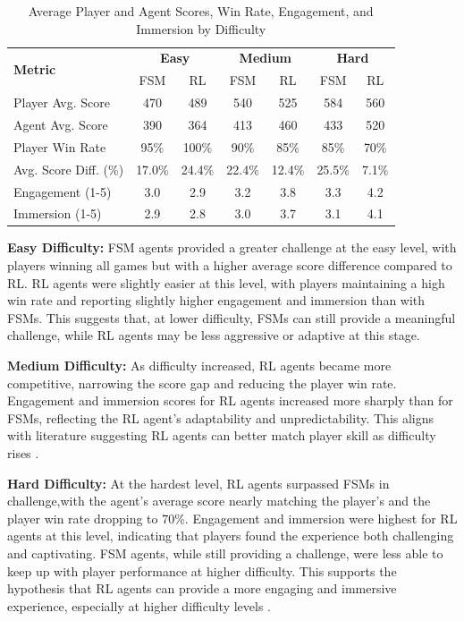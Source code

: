 \documentclass[conference]{IEEEtran}
\begin{document}
\begin{table}[h]
\centering
\caption{Average Player and Agent Scores, Win Rate, Engagement, and Immersion by Difficulty}
\label{tab:results}
\begin{tabular}{lcccccc}
\hline
\multirow{2}{*}{\textbf{Metric}} & \multicolumn{2}{c}{\textbf{Easy}} & \multicolumn{2}{c}{\textbf{Medium}} & \multicolumn{2}{c}{\textbf{Hard}} \\
 & FSM & RL & FSM & RL & FSM & RL \\
\hline
Player Avg. Score         & 470 & 489 & 540 & 525 & 584 & 560 \\
Agent Avg. Score          & 390 & 364 & 413 & 460 & 433 & 520 \\
Player Win Rate           & 95\% & 100\% & 90\% & 85\% & 85\% & 70\% \\
Avg. Score Diff. (\%)     & 17.0\% & 24.4\% & 22.4\% & 12.4\% & 25.5\% & 7.1\% \\
Engagement (1-5)          & 3.0 & 2.9 & 3.2 & 3.8 & 3.3 & 4.2 \\
Immersion (1-5)           & 2.9 & 2.8 & 3.0 & 3.7 & 3.1 & 4.1 \\
\hline
\end{tabular}
\end{table}

\textbf{Easy Difficulty:}  
FSM agents provided a greater challenge at the easy level, with players winning all games but with a higher average score difference compared to RL. RL agents were slightly easier at this level,
with players maintaining a high win rate and reporting slightly higher engagement and immersion than with FSMs. This suggests that, at lower difficulty, FSMs can still provide a meaningful challenge,
while RL agents may be less aggressive or adaptive at this stage.

\textbf{Medium Difficulty:}  
As difficulty increased, RL agents became more competitive, narrowing the score gap and reducing the player win rate. Engagement and immersion scores for RL agents increased more sharply than for FSMs,
reflecting the RL agent's adaptability and unpredictability. This aligns with literature suggesting RL agents can better match player skill as difficulty rises \cite{grech_creating_2023}.

\textbf{Hard Difficulty:}  
At the hardest level, RL agents surpassed FSMs in challenge,with the agent's average score nearly matching the player's and the player win rate dropping to 70\%.
Engagement and immersion were highest for RL agents at this level, indicating that players found the experience both challenging and captivating.
FSM agents, while still providing a challenge, were less able to keep up with player performance at higher difficulty.
This supports the hypothesis that RL agents can provide a more engaging and immersive experience, especially at higher difficulty levels \cite{vinyals_grandmaster_2019}.
\end{document}
